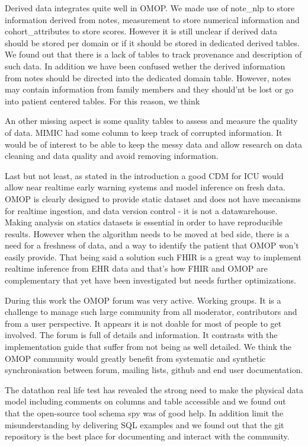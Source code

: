 Derived data integrates quite well in OMOP. We made use of note\_nlp to store
information derived from notes, measurement to store numerical information and
cohort\_attributes to store scores. However it is still unclear if derived data
should be stored per domain or if it should be stored in dedicated derived
tables. We found out that there is a lack of tables to track provenance and
description of such data. In addition we have been confused wether the derived
information from notes should be directed into the dedicated domain table.
However, notes may contain information from family members and they should'nt
be lost or go into patient centered tables. For this reason, we think

An other missing aspect is some quality tables to assess and measure the
quality of data. MIMIC had some column to keep track of corrupted information.
It would be of interest to be able to keep the messy data and allow research on
data cleaning and data quality and avoid removing information.

Last but not least, as stated in the introduction a good CDM for ICU would
allow near realtime early warning systems and model inference on fresh data.
OMOP is clearly designed to provide static dataset and does not have mecanisms
for realtime ingestion, and data version control - it is not a datawarehouse.
Making analysis on statics datasets is essential in order to have reproducible
results. However when the algorithm needs to be moved at bed side, there is a
need for a freshness of data, and a way to identify the patient that OMOP won't
easily provide. That being said a solution such FHIR is a great way to
implement realtime inference from EHR data and that's how FHIR and OMOP are
complementary that yet have been investigated \cite{gatech} but needs further
optimizations.

During this work the OMOP forum was very active. Working groups.  It is a
challenge to manage such large community from all moderator, contributors and
from a user perspective. It appears it is not doable for most of people to get
involved. The forum is full of details and information. It contrasts with the
implementation guide that suffer from not being as well detailed. We think the
OMOP community would greatly benefit from systematic and synthetic
synchronisation between forum, mailing lists, github and end user
documentation.

The datathon real life test has revealed the strong need to make the physical
data model including comments on columns and table accessible and we found out
that the open-source tool schema spy was of good help. In addition limit the
misunderstanding by delivering SQL examples and we found out that the git
repository is the best place for documenting and interact with the community.

